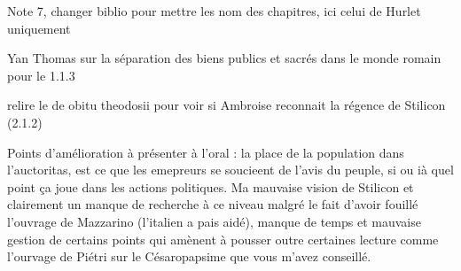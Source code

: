 Note 7, changer biblio pour mettre les nom des chapitres, ici celui de Hurlet uniquement

Yan Thomas sur la séparation des biens publics et sacrés dans le monde romain pour le 1.1.3

relire le de obitu theodosii pour voir si Ambroise reconnait la régence de Stilicon (2.1.2)



Points d'amélioration à présenter à l'oral : la place de la population dans l'auctoritas, est ce que les emepreurs se soucieent de l'avis du peuple, si ou ià quel point ça joue dans les actions politiques. Ma mauvaise vision de Stilicon et clairement un manque de recherche à ce niveau malgré le fait d'avoir fouillé l'ouvrage de Mazzarino (l'italien a pais aidé), manque de temps et mauvaise gestion de certains points qui amènent à pousser outre certaines lecture comme l'ourvage de Piétri sur le Césaropapsime que vous m'avez conseillé.
